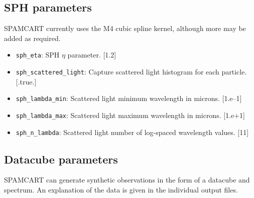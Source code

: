 \documentclass[11pt]{article}
\begin{document}
\subsection{SPH parameters}

SPAMCART currently uses the M4 cubic spline kernel, although more may be added as required.

\begin{itemize}
	
	\item \texttt{sph\_eta}: SPH $\eta$ parameter. [1.2]
	\item \texttt{sph\_scattered\_light}: Capture scattered light histogram for each particle. [.true.]
	\item \texttt{sph\_lambda\_min}: Scattered light minimum wavelength in microns. [1.e--1]
	\item \texttt{sph\_lambda\_max}: Scattered light maximum wavelength in microns. [1.e+1]
	\item \texttt{sph\_n\_lambda}: Scattered light number of log-spaced wavelength values. [11]
	
\end{itemize}

\subsection{Datacube parameters}

SPAMCART can generate synthetic observations in the form of a datacube and spectrum. An explanation of the data is given in the individual output files.
\end{document}
